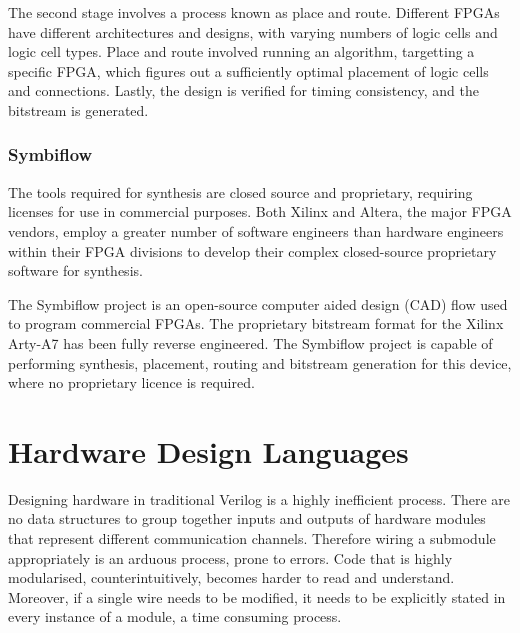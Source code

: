 \documentclass[a4paper,8pt]{report}
\begin{document}
The second stage involves a process known as place and route. Different FPGAs
have different architectures and designs, with varying numbers of logic cells
and logic cell types. Place and route involved running an algorithm, targetting
a specific FPGA, which figures out a sufficiently optimal placement of logic
cells and connections. Lastly, the design is verified for timing consistency,
and the bitstream is generated.

\subsubsection{Symbiflow}
The tools required for synthesis are closed source and proprietary, requiring
licenses for use in commercial purposes. Both Xilinx and Altera, the major FPGA
vendors, employ a greater number of software engineers than hardware engineers
within their FPGA divisions to develop their complex closed-source proprietary
software for synthesis.

The Symbiflow project is an open-source computer aided design (CAD) flow used to
program commercial FPGAs. The proprietary bitstream format for the Xilinx
Arty-A7 has been fully reverse engineered.
The Symbiflow project is capable of performing synthesis, placement, routing
and bitstream generation for this device, where no proprietary licence is required. 


\section{Hardware Design Languages}
Designing hardware in traditional Verilog is a highly inefficient process. There
are no data structures to group together inputs and outputs of hardware modules
that represent different communication channels. Therefore wiring a submodule
appropriately is an arduous process, prone to errors. Code that is highly
modularised, counterintuitively, becomes harder to read and understand.
Moreover, if a single wire needs to be modified, it needs to be explicitly
stated in every instance of a module, a time consuming process.
\end{document}

